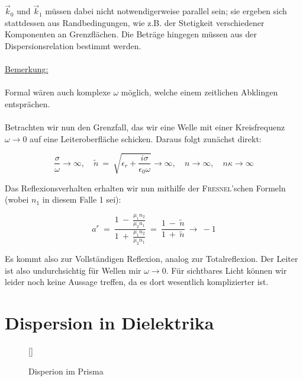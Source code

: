 $\vec{k}_0$ und $\vec{k}_1$ müssen dabei nicht notwendigerweise parallel sein; sie ergeben sich stattdessen aus Randbedingungen, wie z.B. der Stetigkeit verschiedener Komponenten an Grenzflächen. Die Beträge hingegen müssen aus der Dispersionsrelation bestimmt werden.
\ \\
\ \\
\underline{Bemerkung:}\\
\ \\
Formal wären auch komplexe $\omega$ möglich, welche einem zeitlichen Abklingen entsprächen.
\ \\
\ \\
Betrachten wir nun den Grenzfall, das wir eine Welle mit einer Kreisfrequenz $\omega \rightarrow 0$ auf eine Leiteroberfläche schicken. Daraus folgt zunächst direkt:

\begin{equation*}
\frac{\sigma}{\omega} \rightarrow \infty, \quad \tilde{n} \ = \ \sqrt{\epsilon_r + \frac{i\sigma}{\epsilon_0 \omega}}\rightarrow\infty, \quad n\rightarrow\infty,\quad n\kappa\rightarrow\infty
\end{equation*}

Das Reflexionsverhalten erhalten wir nun mithilfe der \textsc{Fresnel}'schen Formeln (wobei $n_1$ in diesem Falle 1 sei):

\begin{equation*}
a^r  \ = \  \frac{1 \ - \ \frac{\mu_1 n_2}{\mu_2 n_1}}{1 \ + \ \frac{\mu_1 n_2}{\mu_2 n_1}} \ = \ \frac{1 \ - \ \tilde{n}}{1\ + \ \tilde{n}} \ \rightarrow\  -1
\end{equation*}

Es kommt also zur Vollständigen Reflexion, analog zur Totalreflexion. Der Leiter ist also undurchsichtig für Wellen mir $\omega \rightarrow 0$. Für sichtbares Licht können wir leider noch keine Aussage treffen, da es dort wesentlich komplizierter ist.

\section{Dispersion in Dielektrika}

\begin{wrapfigure}[]{r}[0cm]{0cm}
	\raisebox{0pt}[\dimexpr{}\baselineskip\relax]{
		\colorbox{hgrey}{
		}
	}
	\caption{Disperion im Prisma}
\end{wrapfigure}

